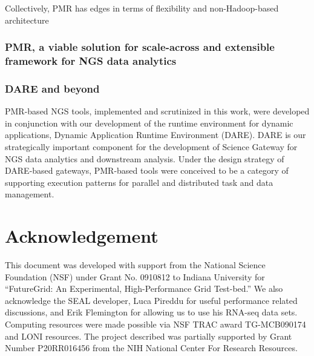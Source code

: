 \documentclass{sig-alternate}
\begin{document}
Collectively, PMR has edges in terms of flexibility and non-Hadoop-based architecture

\subsubsection{PMR, a viable solution for scale-across and extensible framework for NGS data analytics}


\subsubsection{DARE and beyond}
PMR-based NGS tools, implemented and scrutinized in this work, were developed in conjunction with our development of the runtime environment for dynamic applications, Dynamic Application Runtime Environment (DARE).  DARE is our strategically important component for the development of Science Gateway for NGS data analytics and downstream analysis.  Under the design strategy of DARE-based gateways, PMR-based tools were conceived to be a category of supporting execution patterns for parallel and distributed task and data management.  




\section*{Acknowledgement}
This document was developed with support from the National Science
Foundation (NSF) under Grant No.  0910812 to Indiana University for
``FutureGrid: An Experimental, High-Performance Grid Test-bed.''  We
also acknowledge the SEAL developer, Luca Pireddu for useful performance related
discussions, and Erik Flemington for allowing us to use his RNA-seq data sets. Computing resources were made possible via NSF TRAC award TG-MCB090174 and LONI resources.  The project described was partially
supported by Grant Number P20RR016456 from the NIH National Center For
Research Resources.

 

\end{document}
